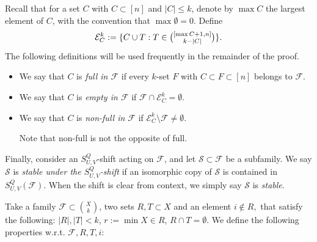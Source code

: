 \documentclass[11pt]{article}
\def\marrow{{\boldmath {\marginpar[\hfill$\rightarrow \rightarrow$]{$\leftarrow \leftarrow$}}}}
\def\andrey#1{{\sc Andrey: }{\marrow\sf \textcolor{blue}{#1}}}
\newcommand{\m}{\mathcal}
\def\yang#1{{\sc Yang: }{\marrow\sf \textcolor{cyan}{#1}}}
\begin{document}
Recall that for  a set $C$ with $C\subset [n]$ and $|C|\le k$, denote by $\max C$ the largest element of $C$,
with the convention that $\max \emptyset =0$.
Define
\begin{equation}\label{ec}
    \mathcal{E}^k_C:=\{C\cup T: T\in \tbinom{[\max C+1, n]}{ k-|C|}\}.
\end{equation}
The following definitions will be used frequently in the remainder of the proof.
\begin{itemize}
    \item We say that $C$ is \emph{full in $\mathcal{F}$} if every $k$-set $F$ with $C \subset F \subset [n]$ belongs to $\mathcal{F}$.
    \item We say that $C$ is \emph{empty in $\mathcal{F}$} if 
    $
    \mathcal{F} \cap \mathcal{E}^k_C = \emptyset.
    $
    \item We say that $C$ is {\it non-full in $\mathcal{F}$} if $\mathcal{E}^k_C \setminus \mathcal{F} \ne \emptyset $. 

Note that non-full is not the opposite of full.  
\end{itemize}

Finally, consider an $S_{U,V}^Q$-shift acting on $\mathcal{F}$, and let $\mathcal{S} \subset \mathcal{F}$ be a subfamily. We say $\mathcal{S}$ is \emph{stable under the $S_{U,V}^Q$-shift} if an isomorphic copy of $\mathcal{S}$ is contained in $S_{U,V}^Q(\mathcal{F})$. 
When the shift is clear from context, we simply say $\mathcal{S}$ is \emph{stable}.


Take a family $\m F\subset {X\choose k}$, two sets $R, T\subset X$ and an element $i\not\in R,$ that satisfy the following: $|R|, |T|<k$, $r:=\min X\in R$, $R\cap T=\emptyset$. We define the following properties w.r.t. $\m F, R,T, i$: 
\end{document}
